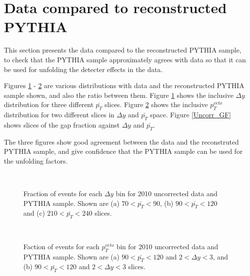 
\section{Data compared to reconstructed PYTHIA }
\label{sec:GBJ1:Uncorr}
This section presents the data compared to the reconstructed PYTHIA sample, to check that the PYTHIA sample approximately agrees with data so that it can be used for unfolding the detecter effects in the data. 

Figures \ref{UncorrIncl_dy} - \ref{Uncorr_Pt3_dy} are various distributions with data and the reconstructed PYTHIA sample shown, and also the ratio between them.
Figure \ref{UncorrIncl_dy} shows the inclusive $\Delta y$ distribution for three different $\bar{p_T}$ slices. Figure \ref{Uncorr_Pt3_dy} shows the inclusive $p_T^{veto}$ distribution for two different slices in $\Delta y$ and $\bar{p_T}$ space. Figure \ref{Uncorr_GF} shows slices of the gap fraction against $\Delta y$ and $\bar{p_T}$.

The three figures show good agreement between the data and the reconstruted PYTHIA sample, and give confidence that the PYTHIA sample can be used for the unfolding factors. 

\begin{figure}
\centering
\mbox{
              \quad
              \quad
}
\mbox{
              \quad
                              }
\caption[Comparison between data and PYTHIA sample in the inclusive distribution for $\Delta y$]{
Fraction of events for each $\Delta y$ bin for 2010 uncorrected data and PYTHIA sample. Shown are (a) $70<\bar{p_T}<90$, (b) $90<\bar{p_T}<120$ and (c) $210<\bar{p_T}<240$ slices.
\label{UncorrIncl_dy}}
\end{figure}

\begin{figure}
\centering
\mbox{
              \quad
              \quad
                              }
\caption[Comparison between data and PYTHIA sample for Pt3 distribution]{Faction of events for each $p_T^{veto}$ bin for 2010 uncorrected data and PYTHIA sample. Shown are (a) $90<\bar{p_T}<120$ and $2 < \Delta y <3$, and (b) $90<\bar{p_T}<120$ and $2 < \Delta y <3$ slices.\label{Uncorr_Pt3_dy}}
\end{figure}

